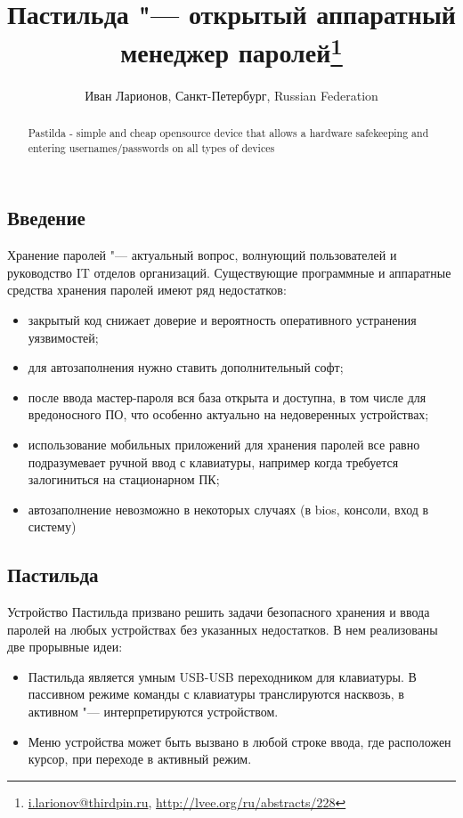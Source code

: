 \documentclass[10pt, a5paper]{article}
\begin{document}
\title{Пастильда "--- открытый аппаратный менеджер паролей\footnote{\url{i.larionov@thirdpin.ru}, \url{http://lvee.org/ru/abstracts/228}}}
\author{Иван Ларионов, Санкт-Петербург, Russian Federation}
\maketitle
\begin{abstract}
Pastilda - simple and cheap opensource device that allows a hardware safekeeping and entering usernames/passwords on all types of devices
\end{abstract}
\subsection*{Введение}

Хранение паролей "--- актуальный вопрос, волнующий пользователей и руководство IT отделов организаций. Существующие программные и аппаратные средства хранения паролей имеют ряд недостатков:

\begin{itemize}
  \item закрытый код снижает доверие и вероятность оперативного устранения уязвимостей;
  \item для автозаполнения нужно ставить дополнительный софт;
  \item после ввода мастер-пароля вся база открыта и доступна, в том числе для вредоносного ПО, что особенно актуально на недоверенных устройствах;
  \item использование мобильных приложений для хранения паролей все равно подразумевает ручной ввод с клавиатуры, например когда требуется залогиниться на стационарном ПК;
  \item автозаполнение невозможно в некоторых случаях (в bios, консоли, вход в систему)
\end{itemize}

\subsection*{Пастильда}

Устройство Пастильда призвано решить задачи безопасного хранения и ввода паролей на любых устройствах без указанных недостатков. В нем реализованы две прорывные идеи:

\begin{itemize}
  \item Пастильда является умным USB-USB переходником для клавиатуры. В пассивном режиме команды с клавиатуры транслируются насквозь, в активном "--- интерпретируются устройством.
  \item Меню устройства может быть вызвано в любой строке ввода, где расположен курсор, при переходе в активный режим.
\end{itemize}
\end{document}
